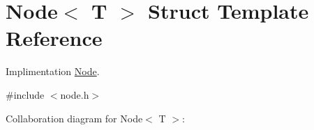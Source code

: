 \hypertarget{structNode}{}\section{Node$<$ T $>$ Struct Template Reference}
\label{structNode}


Implimentation \hyperlink{structNode}{Node}.  




{\ttfamily \#include $<$node.\+h$>$}



Collaboration diagram for Node$<$ T $>$\+:
